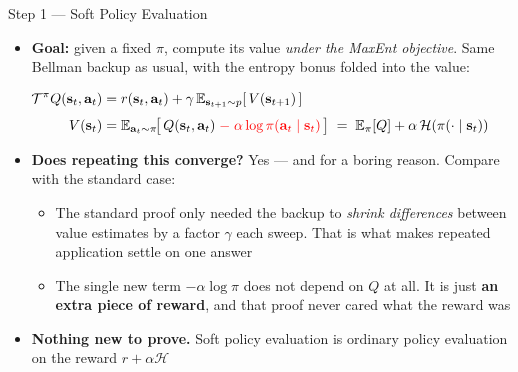 \begin{frame}{Step 1 --- Soft Policy Evaluation}
\begin{itemize}
    \item \textbf{Goal:} given a fixed $\pi$, compute its value \emph{under the MaxEnt objective}. Same Bellman backup as usual, with the entropy bonus folded into the value:
\end{itemize}
\begin{align*}
\mathcal{T}^{\pi} Q(\mathbf{s}_t, \mathbf{a}_t) &= r(\mathbf{s}_t, \mathbf{a}_t) + \gamma\, \mathbb{E}_{\mathbf{s}_{t+1} \sim p}\!\left[\, V(\mathbf{s}_{t+1})\, \right] \\[0.3em]
V(\mathbf{s}_t) &= \mathbb{E}_{\mathbf{a}_t \sim \pi}\!\big[\, Q(\mathbf{s}_t, \mathbf{a}_t) \; \textcolor{red}{-\; \alpha \log \pi(\mathbf{a}_t \mid \mathbf{s}_t)} \,\big]
\;=\; \mathbb{E}_{\pi}[Q] + \alpha\,\mathcal{H}(\pi(\cdot\mid\mathbf{s}_t))
\end{align*}
\begin{itemize}
    \item \textbf{Does repeating this converge?} Yes --- and for a boring reason. Compare with the standard case:
    \begin{itemize}
        \item The standard proof only needed the backup to \emph{shrink differences} between value estimates by a factor $\gamma$ each sweep. That is what makes repeated application settle on one answer
        \item The single new term $-\alpha\log\pi$ does not depend on $Q$ at all. It is just \textbf{an extra piece of reward}, and that proof never cared what the reward was
    \end{itemize}
    \item[$\Rightarrow$] \textbf{Nothing new to prove.} Soft policy evaluation is ordinary policy evaluation on the reward $r + \alpha\mathcal{H}$
\end{itemize}
\end{frame}

